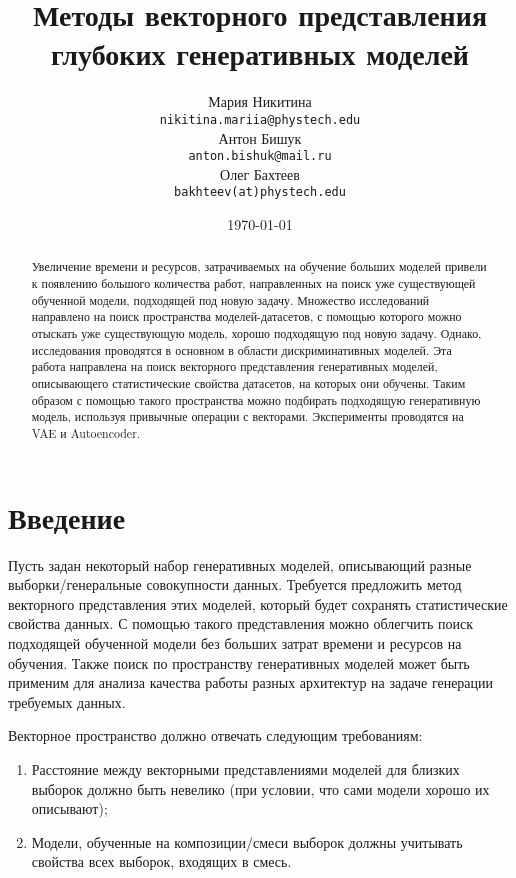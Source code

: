 \documentclass[a4paper, 14pt]{article}
\title{Методы векторного представления глубоких генеративных моделей}
\author{
    Мария Никитина \\
    \texttt{nikitina.mariia@phystech.edu} \\
    \And
    Антон Бишук \\
    \texttt{anton.bishuk@mail.ru} \\
    \And
    Олег Бахтеев \\
    \texttt{bakhteev(at)phystech.edu}
}
\date{\today}
\begin{document}
\maketitle
% 
\setcounter{page}{2}

\begin{abstract}
Увеличение времени и ресурсов, затрачиваемых на обучение больших моделей привели к появлению большого количества работ, направленных на поиск уже существующей обученной модели, подходящей под новую задачу. Множество исследований направлено на поиск пространства моделей-датасетов, с помощью которого можно отыскать уже существующую модель, хорошо подходящую под новую задачу. Однако, исследования проводятся в основном в области дискриминативных моделей. Эта работа направлена на поиск векторного представления генеративных моделей, описывающего статистические свойства датасетов, на которых они обучены. Таким образом с помощью такого пространства можно подбирать подходящую генеративную модель, используя привычные операции с векторами. Эксперименты проводятся на VAE и Autoencoder.
\end{abstract}


\newpage



\section{Введение}
Пусть задан некоторый набор генеративных моделей, описывающий разные выборки/генеральные совокупности данных. Требуется предложить метод векторного представления этих моделей, который будет сохранять статистические свойства данных. С помощью такого представления можно облегчить поиск подходящей обученной модели  без больших затрат времени и ресурсов на обучения. Также поиск по пространству генеративных моделей может быть применим для анализа качества работы разных архитектур на задаче генерации требуемых данных.

Векторное пространство должно отвечать следующим требованиям:

\begin{enumerate}
    \item Расстояние между векторными представлениями моделей для близких выборок должно быть невелико (при условии, что сами модели хорошо их описывают);

    \item Модели, обученные на композиции/смеси выборок должны учитывать свойства всех выборок, входящих в смесь.
\end{enumerate}
\end{document}
